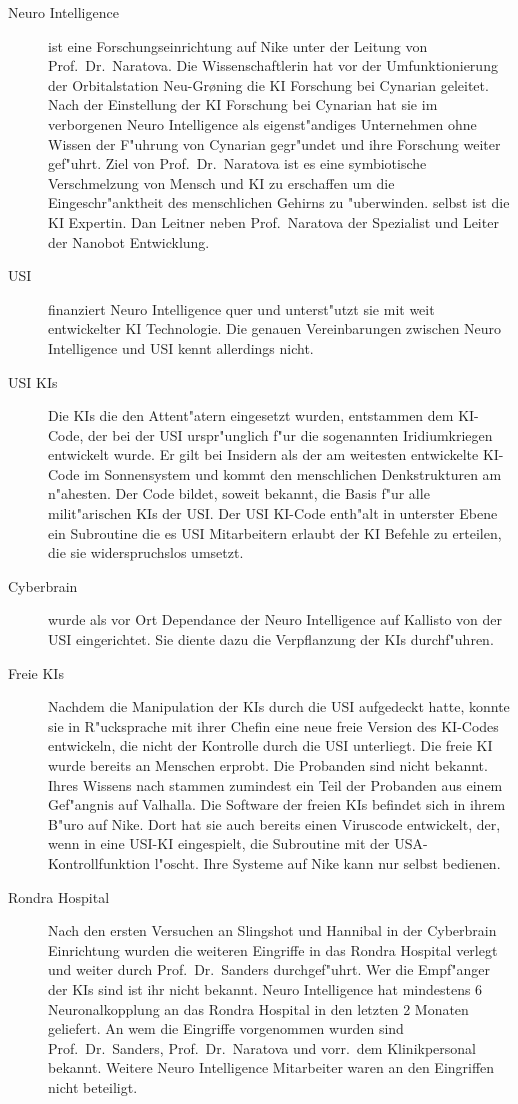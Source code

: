 \begin{description}
	\item[Neuro Intelligence] ist eine Forschungseinrichtung auf Nike unter der Leitung von Prof.~Dr.~Naratova. Die Wissenschaftlerin hat 
		vor der Umfunktionierung der Orbitalstation Neu-Gr{\o}ning die KI Forschung bei Cynarian geleitet. Nach der Einstellung der KI Forschung bei Cynarian hat sie im verborgenen Neuro Intelligence als eigenst"andiges Unternehmen ohne Wissen der F"uhrung von Cynarian gegr"undet und ihre Forschung weiter gef"uhrt. Ziel von Prof.~Dr.~Naratova ist es eine symbiotische Verschmelzung von Mensch und KI zu erschaffen um die Eingeschr"anktheit des menschlichen Gehirns zu "uberwinden. \ml{} selbst ist die KI Expertin. Dan Leitner neben Prof.~Naratova der Spezialist und Leiter der Nanobot Entwicklung.
	\item[USI] finanziert Neuro Intelligence quer und unterst"utzt sie mit weit entwickelter KI Technologie. Die genauen Vereinbarungen 
		zwischen Neuro Intelligence und USI kennt \ml{} allerdings nicht.
    \item[USI KIs] Die KIs die den Attent"atern eingesetzt wurden, entstammen dem KI-Code, der bei der USI urspr"unglich f"ur die  
		sogenannten Iridiumkriegen entwickelt wurde. Er gilt bei Insidern als der am weitesten entwickelte KI-Code im Sonnensystem und kommt den menschlichen Denkstrukturen am n"ahesten. Der Code bildet, soweit \ml{} bekannt, die Basis f"ur alle milit"arischen KIs der USI. Der USI KI-Code enth"alt in unterster Ebene ein Subroutine die es USI Mitarbeitern erlaubt der KI Befehle zu erteilen, die sie widerspruchslos umsetzt.
	\item[Cyberbrain] wurde als vor Ort Dependance der Neuro Intelligence auf Kallisto von der USI eingerichtet. Sie diente dazu die		
		Verpflanzung der KIs durchf"uhren.
	\item[Freie KIs] Nachdem \ml{} die Manipulation der KIs durch die USI aufgedeckt hatte, konnte sie in R"ucksprache mit ihrer Chefin 
		eine neue freie Version des KI-Codes entwickeln, die nicht der Kontrolle durch die USI unterliegt. Die freie KI wurde bereits an Menschen erprobt. Die Probanden sind \ml{} nicht bekannt. Ihres Wissens nach stammen zumindest ein Teil der Probanden aus einem Gef"angnis auf Valhalla. Die Software der freien KIs befindet sich in ihrem B"uro auf Nike. Dort hat sie auch bereits einen Viruscode entwickelt, der, wenn in eine USI-KI eingespielt, die Subroutine mit der USA-Kontrollfunktion l"oscht. Ihre Systeme auf Nike kann \ml{} nur selbst bedienen.
	\item[Rondra Hospital] Nach den ersten Versuchen an Slingshot und Hannibal in der Cyberbrain Einrichtung wurden die weiteren Eingriffe 	
		in das Rondra Hospital verlegt und weiter durch Prof.~Dr.~Sanders durchgef"uhrt. Wer die Empf"anger der KIs sind ist ihr nicht bekannt. Neuro Intelligence hat mindestens 6 Neuronalkopplung an das Rondra Hospital in den letzten 2 Monaten geliefert. An wem die Eingriffe vorgenommen wurden sind Prof.~Dr.~Sanders, Prof.~Dr.~Naratova und vorr.~dem Klinikpersonal bekannt. Weitere Neuro Intelligence Mitarbeiter waren an den Eingriffen nicht beteiligt.
\end{description}

